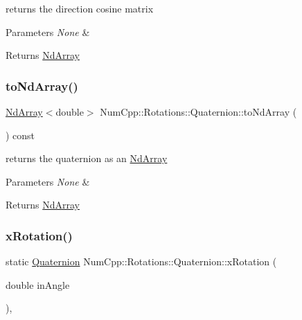 returns the direction cosine matrix


\begin{DoxyParams}{Parameters}
{\em None} & \\
\hline
\end{DoxyParams}
\begin{DoxyReturn}{Returns}
\mbox{\hyperlink{class_num_cpp_1_1_nd_array}{Nd\+Array}} 
\end{DoxyReturn}
\mbox{\label{class_num_cpp_1_1_rotations_1_1_quaternion_acd8bcd58737b24eb3a36962c455a0d48}} 
\subsubsection{\texorpdfstring{to\+Nd\+Array()}{toNdArray()}}
{\footnotesize\ttfamily \mbox{\hyperlink{class_num_cpp_1_1_nd_array}{Nd\+Array}}$<$double$>$ Num\+Cpp\+::\+Rotations\+::\+Quaternion\+::to\+Nd\+Array (\begin{DoxyParamCaption}{ }\end{DoxyParamCaption}) const\hspace{0.3cm}{\ttfamily [inline]}}

returns the quaternion as an \mbox{\hyperlink{class_num_cpp_1_1_nd_array}{Nd\+Array}}


\begin{DoxyParams}{Parameters}
{\em None} & \\
\hline
\end{DoxyParams}
\begin{DoxyReturn}{Returns}
\mbox{\hyperlink{class_num_cpp_1_1_nd_array}{Nd\+Array}} 
\end{DoxyReturn}
\mbox{\label{class_num_cpp_1_1_rotations_1_1_quaternion_aa10a3ca29a4ac6c2f7854f47e4ca4bf9}} 
\subsubsection{\texorpdfstring{x\+Rotation()}{xRotation()}}
{\footnotesize\ttfamily static \mbox{\hyperlink{class_num_cpp_1_1_rotations_1_1_quaternion}{Quaternion}} Num\+Cpp\+::\+Rotations\+::\+Quaternion\+::x\+Rotation (\begin{DoxyParamCaption}\item[{double}]{in\+Angle }\end{DoxyParamCaption})\hspace{0.3cm}{\ttfamily [inline]}, {\ttfamily [static]}}

